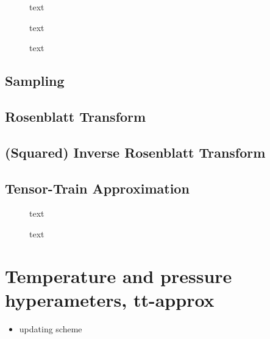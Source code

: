 \begin{figure}[h]
	\centering
	\scalebox{0.66}{}
	\caption[]{text}
	\label{fig:Results}
\end{figure}


\begin{figure}[h]
	\centering
	\scalebox{0.66}{}
	\caption[]{text}
	\label{fig:Results}
\end{figure}


\begin{figure}[h]
	\centering
	\scalebox{0.66}{}
	\caption[]{text}
	\label{fig:Results}
\end{figure}



\subsection{Sampling}

\subsection{ Rosenblatt Transform}
\subsection{(Squared) Inverse Rosenblatt Transform}
\subsection{Tensor-Train Approximation}

\begin{figure}[h]
	\centering
	\scalebox{0.66}{}
	\caption[]{text}
	\label{fig:Results}
\end{figure}

\begin{figure}[h]
	\centering
	\scalebox{0.66}{}
	\caption[]{text}
	\label{fig:Results}
\end{figure}

\section{Temperature and pressure hyperameters, tt-approx}

\begin{itemize}
	\item updating scheme
\end{itemize}

